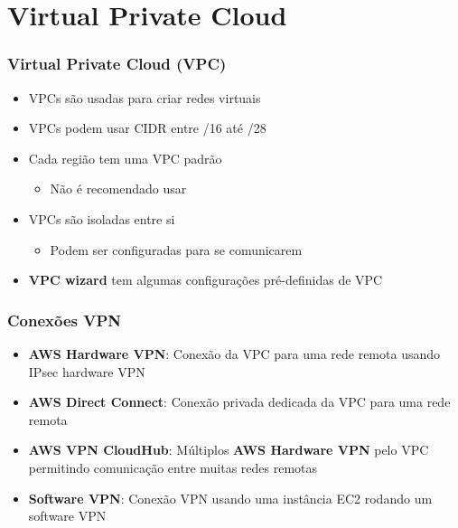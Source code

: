 \section{Virtual Private Cloud}

\begin{frame}
	\frametitle{Virtual Private Cloud (VPC)}
	\begin{itemize}
		\item VPCs são usadas para criar redes virtuais
		\item VPCs podem usar CIDR entre /16 até /28
		\item Cada região tem uma VPC padrão
			\begin{itemize}
				\item Não é recomendado usar
			\end{itemize}
		\item VPCs são isoladas entre si
			\begin{itemize}
				\item Podem ser configuradas para se comunicarem
			\end{itemize}
		\item \textbf{VPC wizard} tem algumas configurações pré-definidas de VPC
	\end{itemize}
\end{frame}

\begin{frame}
	\frametitle{Conexões VPN}
	\begin{itemize}
		\item \textbf{AWS Hardware VPN}: Conexão da VPC para uma rede remota usando IPsec hardware VPN
		\item \textbf{AWS Direct Connect}: Conexão privada dedicada da VPC para uma rede remota
		\item \textbf{AWS VPN CloudHub}: Múltiplos \textbf{AWS Hardware VPN} pelo VPC permitindo comunicação entre muitas redes remotas
		\item \textbf{Software VPN}: Conexão VPN usando uma instância EC2 rodando um software VPN
	\end{itemize}
\end{frame}

